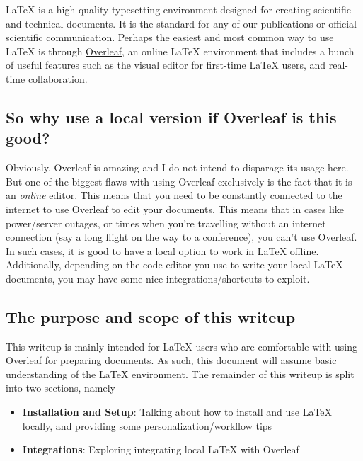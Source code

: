 \graphicspath{{Parts/1_Introductions/graphics/}}

\LaTeX{}{} is a high quality typesetting environment designed for creating scientific and technical documents. It is the standard for any of our publications or official scientific communication. Perhaps the easiest and most common way to use \LaTeX{}{} is through \hyperlink{https://www.overleaf.com}{Overleaf}, an online \LaTeX{} environment that includes a bunch of useful features such as the visual editor for first-time \LaTeX{} users, and real-time collaboration.

\subsection{So why use a local version if Overleaf is this good?}
Obviously, Overleaf is amazing and I do not intend to disparage its usage here. But one of the biggest flaws with using Overleaf exclusively is the fact that it is an \emph{online} editor. This means that you need to be constantly connected to the internet to use Overleaf to edit your documents. This means that in cases like power/server outages, or times when you're travelling without an internet connection (say a long flight on the way to a conference), you can't use Overleaf. In such cases, it is good to have a local option to work in \LaTeX{} offline. Additionally, depending on the code editor you use to write your local \LaTeX{} documents, you may have some nice integrations/shortcuts to exploit.

\subsection{The purpose and scope of this writeup}
This writeup is mainly intended for \LaTeX{} users who are comfortable with using Overleaf for preparing documents. As such, this document will assume basic understanding of the \LaTeX{} environment. The remainder of this writeup is split into two sections, namely
\begin{itemize}
    \item \textbf{Installation and Setup}: Talking about how to install and use \LaTeX{} locally, and providing some personalization/workflow tips
    \item \textbf{Integrations}: Exploring integrating local \LaTeX{} with Overleaf
\end{itemize}

